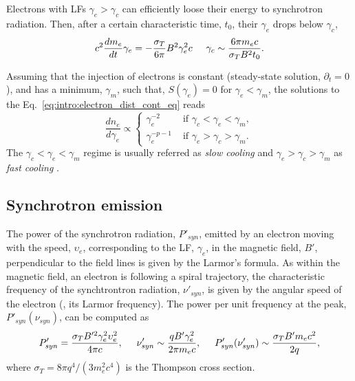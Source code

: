 Electrons with \acp{LF} $\gamma_e > \gamma_c$ can efficiently loose their energy to 
synchrotron radiation. Then, after a certain characteristic time, $t_0$, 
their $\gamma_e$ drops below $\gamma_c$, 
%
\begin{equation}
c^2 \frac{dm_e}{dt} \gamma_e = -\frac{\sigma_T}{6\pi} B^2 \gamma_e^2 c
\hspace{5mm}
\gamma_c \sim \frac{6 \pi m_e c}{\sigma_T B^2 t_0}.
\end{equation}


Assuming that the injection of electrons is constant (steady-state solution,
$\partial_t = 0$), and has a minimum, $\gamma_m$, such that, 
$S(\gamma_e) = 0$ for $\gamma_e < \gamma_m$, the solutions to the Eq.~\eqref{eq:intro:electron_dist_cont_eq} reads 
%
\begin{equation}
\frac{dn_e}{d\gamma_e} \propto 
\begin{cases}
\gamma_e^{-2} &\text{ if } \gamma_c < \gamma_e < \gamma_m, \\
\gamma_e^{-p-1} &\text{ if } \gamma_e > \gamma_c > \gamma_m. 
\end{cases}
\label{eq:afterglow:elec_dist}
\end{equation}
%
The $\gamma_c < \gamma_e < \gamma_m$ regime is usually referred as 
\textit{slow cooling} and $\gamma_e > \gamma_c > \gamma_m$ as \textit{fast cooling} 
\citep{Sari:1997qe}.





\subsection{Synchrotron emission}

The power of the synchrotron radiation, $P'_{syn}$, emitted by an electron moving with 
the speed, $\upsilon_e$, corresponding to the \ac{LF}, $\gamma_e$, 
in the magnetic field, $B'$, perpendicular to the field lines is given by the Larmor's formula.
%
As within the magnetic field, an electron is following a spiral trajectory,
the characteristic frequency of the synchtrontron radiation, $\nu'_{syn}$, is given 
by the angular speed of the electron (\eg, its Larmor frequency).
%
The power per unit frequency at the peak, $P'_{syn}(\nu_{syn})$, can be computed as 
\citep{RybickiLightman:1985}
%
\begin{equation}
P'_{syn} = \frac{\sigma_T B'^2\gamma_e^2\upsilon_e^2}{4\pi c}, 
\hspace{5mm} 
\nu'_{syn} \sim \frac{q B' \gamma_e^2}{2\pi m_e c},
\hspace{5mm}
P'_{syn}(\nu_{syn}') \sim \frac{\sigma_T B' m_e c^2}{2 q},
\end{equation}
%
where $\sigma_T = 8\pi q^4 / (3m_e^2c^4)$ is the Thompson cross section.


